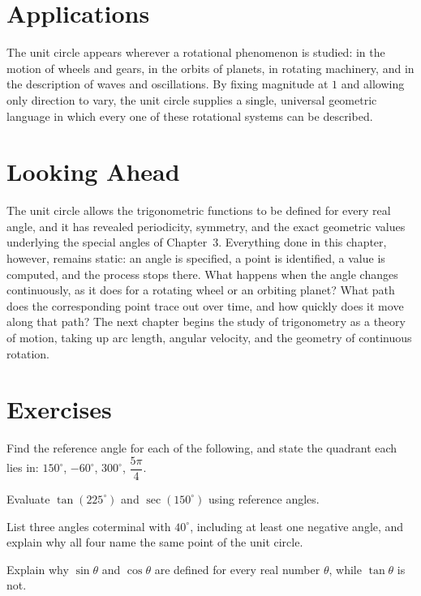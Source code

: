 \section{Applications}

The unit circle appears wherever a rotational phenomenon is studied: in the
motion of wheels and gears, in the orbits of planets, in rotating
machinery, and in the description of waves and oscillations. By fixing
magnitude at $1$ and allowing only direction to vary, the unit circle
supplies a single, universal geometric language in which every one of these
rotational systems can be described.

\section{Looking Ahead}

The unit circle allows the trigonometric functions to be defined for every
real angle, and it has revealed periodicity, symmetry, and the exact
geometric values underlying the special angles of Chapter~3. Everything
done in this chapter, however, remains static: an angle is specified, a
point is identified, a value is computed, and the process stops there. What
happens when the angle changes continuously, as it does for a rotating
wheel or an orbiting planet? What path does the corresponding point trace
out over time, and how quickly does it move along that path? The next
chapter begins the study of trigonometry as a theory of motion, taking up
arc length, angular velocity, and the geometry of continuous rotation.

\section{Exercises}
\begin{exercise}
Find the reference angle for each of the following, and state the quadrant
each lies in: $150^\circ$, $-60^\circ$, $300^\circ$, $\dfrac{5\pi}{4}$.
\end{exercise}

\begin{exercise}
Evaluate $\tan(225^\circ)$ and $\sec(150^\circ)$ using reference angles.
\end{exercise}

\begin{exercise}
List three angles coterminal with $40^\circ$, including at least one
negative angle, and explain why all four name the same point of the unit
circle.
\end{exercise}

\begin{exercise}
Explain why $\sin\theta$ and $\cos\theta$ are defined for every real number
$\theta$, while $\tan\theta$ is not.
\end{exercise}
